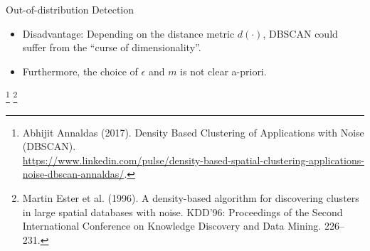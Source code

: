 \documentclass[11pt,compress,t,notes=noshow, xcolor=table]{beamer}
\begin{document}
\begin{frame}{Out-of-distribution Detection}
\begin{itemize}
		\item Disadvantage: Depending on the distance metric $d(\cdot)$, DBSCAN could suffer from the ``curse of dimensionality''. 
		\item Furthermore, the choice of $\epsilon$ and $m$ is not clear a-priori. 
\end{itemize}
	\footnote[frame]{Abhijit Annaldas (2017). Density Based Clustering of Applications with Noise (DBSCAN).\\ \url{https://www.linkedin.com/pulse/density-based-spatial-clustering-applications-noise-dbscan-annaldas/}.}
	\footnote[frame]{Martin Ester et al. (1996). A density-based algorithm for discovering clusters in large spatial databases with noise. KDD'96: Proceedings of the Second International Conference on Knowledge Discovery and Data Mining. 226–231.}
\end{frame}
\end{document}
